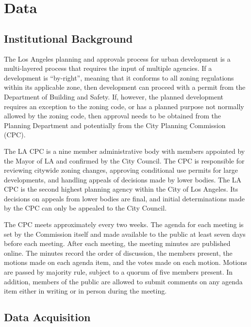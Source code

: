 \section{Data}\label{sec_data}

\subsection{Institutional Background}

The Los Angeles planning and approvals process for urban development is a multi-layered process that requires the input of multiple agencies. If a development is ``by-right'', meaning that it conforms to all zoning regulations within its applicable zone, then development can proceed with a permit from the Department of Building and Safety. If, however, the planned development requires an exception to the zoning code, or has a planned purpose not normally allowed by the zoning code, then approval needs to be obtained from the Planning Department and potentially from the City Planning Commission (CPC).

The LA CPC is a nine member administrative body with members appointed by the Mayor of LA and confirmed by the City Council. The CPC is responsible for reviewing citywide zoning changes, approving conditional use permits for large developments, and handling appeals of decisions made by lower bodies. The LA CPC is the second highest planning agency within the City of Los Angeles. Its decisions on appeals from lower bodies are final, and initial determinations made by the CPC can only be appealed to the City Council.

The CPC meets approximately every two weeks. The agenda for each meeting is set by the Commission itself and made available to the public at least seven days before each meeting. After each meeting, the meeting minutes are published online. The minutes record the order of discussion, the members present, the motions made on each agenda item, and the votes made on each motion. Motions are passed by majority rule, subject to a quorum of five members present. In addition, members of the public are allowed to submit comments on any agenda item either in writing or in person during the meeting. 

\subsection{Data Acquisition}

